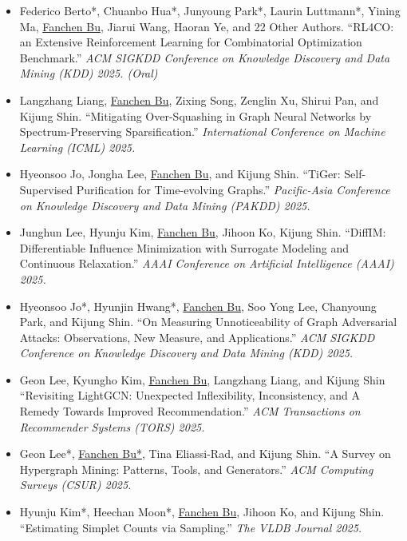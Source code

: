 \documentclass{resume}
\begin{document}
\begin{itemize}[parsep=0.5ex]
  \item [{[C16]}]
  Federico Berto*, Chuanbo Hua*, Junyoung Park*, Laurin Luttmann*, Yining Ma, \underline{Fanchen Bu}, Jiarui Wang, Haoran Ye, and 22 Other Authors.
  ``RL4CO: an Extensive Reinforcement Learning for Combinatorial Optimization Benchmark.''
  \textit{ACM SIGKDD Conference on Knowledge Discovery and Data Mining (KDD) 2025. (Oral)}

  \item [{[C15]}]
  Langzhang Liang, \underline{Fanchen Bu}, Zixing Song, Zenglin Xu, Shirui Pan, and Kijung Shin.
  ``Mitigating Over-Squashing in Graph Neural Networks by Spectrum-Preserving Sparsification.''
  \textit{International Conference on Machine Learning (ICML) 2025.}
  
  \item [{[C14]}]
  Hyeonsoo Jo, Jongha Lee, \underline{Fanchen Bu}, and Kijung Shin.
  ``TiGer: Self-Supervised Purification for Time-evolving Graphs.''
  \textit{Pacific-Asia Conference on Knowledge Discovery and Data Mining (PAKDD) 2025.}

  \item [{[C13]}] 
  Junghun Lee, Hyunju Kim, \underline{Fanchen Bu}, Jihoon Ko, Kijung Shin.
  ``DiffIM: Differentiable Influence Minimization with Surrogate Modeling and Continuous Relaxation.''
  \textit{AAAI Conference on Artificial Intelligence (AAAI) 2025.}
  
  \item [{[C12]}] 
  Hyeonsoo Jo*, Hyunjin Hwang*, \underline{Fanchen Bu}, Soo Yong Lee, Chanyoung Park, and Kijung Shin.
  ``On Measuring Unnoticeability of Graph Adversarial Attacks: Observations, New Measure, and Applications.''
  \textit{ACM SIGKDD Conference on Knowledge Discovery and Data Mining (KDD) 2025.}    

  \item [{[J5]}] 
  Geon Lee, Kyungho Kim, \underline{Fanchen Bu}, Langzhang Liang, and Kijung Shin
  ``Revisiting LightGCN: Unexpected Inflexibility, Inconsistency, and A Remedy Towards Improved Recommendation.''
  \textit{ACM Transactions on Recommender Systems (TORS) 2025.}
  
  \item [{[J4]}] 
  Geon Lee*, \underline{Fanchen Bu*}, Tina Eliassi-Rad, and Kijung Shin.
  ``A Survey on Hypergraph Mining: Patterns, Tools, and Generators.''
  \textit{ACM Computing Surveys (CSUR) 2025.}
  
  \item [{[J3]}] 
  Hyunju Kim*, Heechan Moon*, \underline{Fanchen Bu}, Jihoon Ko, and Kijung Shin.
  ``Estimating Simplet Counts via Sampling.''
  \textit{The VLDB Journal 2025.}


\end{itemize}
\end{document}
